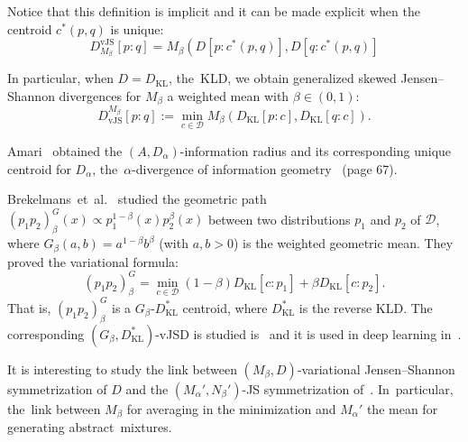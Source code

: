 \documentclass[entropy,article,accept,oneauthor,pdftex,entropy]{Definitions/mdpi}
\def\vJS{\mathrm{vJS}}
\def\KL{\mathrm{KL}}
\def\calD{\mathcal{D}}
\begin{document}
\begin{paracol}{2}
Notice that this definition is implicit and it can be made explicit when the centroid $c^*(p,q)$ is unique:
\begin{equation}
D^\vJS_{M_\beta}[p:q] =M_\beta\left(D[p:c^*(p,q)], D[q:c^*(p,q)]\right.
\end{equation}





In particular, when $D=D_\KL$, the~KLD, we obtain generalized skewed Jensen--Shannon divergences for $M_\beta$  a  weighted mean with 
$\beta\in(0,1)$:
\begin{equation}\label{def:genJSD}
D_\vJS^{M_\beta}[p:q] := \min_{c\in\calD} M_\beta\left(D_\KL[p:c], D_\KL[q:c]\right).
\end{equation}
 

\begin{Example}
Amari~\cite{Amari-2007} obtained the $(A,D_\alpha)$-information radius and its corresponding unique centroid  for $D_\alpha$, the~$\alpha$-divergence of information geometry~\cite{IG-2016} (page 67).
\end{Example}

\begin{Example}
Brekelmans~et~al.~\cite{LikelihoodRatioEF-2020} studied the geometric path $(p_1p_2)^G_\beta(x) \propto p_1^{1-\beta}(x)p_2^\beta(x)$ between two distributions $p_1$ and $p_2$ of $\calD$, where $G_\beta(a,b)=a^{1-\beta}b^\beta$ (with $a,b>0$) is the weighted geometric mean.
They proved the variational formula:
\begin{equation}
(p_1p_2)^G_\beta = \min_{c\in\calD} (1-\beta)D_\KL[c:p_1]+\beta D_\KL[c:p_2].
\end{equation}
That is, $(p_1p_2)^G_\beta$ is a $G_\beta$-$D_\KL^*$ centroid, where $D_\KL^*$ is the reverse KLD.
The corresponding $(G_\beta,D_\KL^*)$-vJSD is studied is~\cite{JSsym-2019} and it is used in deep learning in~\cite{VIGJSD-2020}.

It is interesting to study the link between $(M_\beta,D)$-variational Jensen--Shannon symmetrization of $D$ and the 
$(M_\alpha',N_\beta')$-JS symmetrization of~\cite{JSsym-2019}. In~particular, the~link between $M_\beta$ for averaging in the minimization and $M_\alpha'$ the mean for generating abstract~mixtures.


\end{Example}
\end{paracol}
\end{document}
